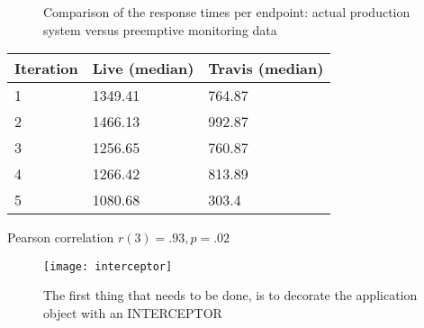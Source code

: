 
\begin{figure}[h!]
  \centering
  \quad
  \caption{Comparison of the response times per endpoint: actual production system versus preemptive monitoring data}
  \label{fig:preemptive}
\end{figure}


\begin{table}[h]
  \begin{tabular}{lll}
    \toprule
    Iteration & \bfseries Live (median) & \bfseries Travis (median)\\
    \midrule
    1 & 1349.41 & 764.87\\ 
    2 & 1466.13 & 992.87\\
    3 & 1256.65 & 760.87\\
    4 & 1266.42 & 813.89\\
    5 & 1080.68 & 303.4\\
    \bottomrule
  \end{tabular}
\end{table}

Pearson correlation $r(3)=.93, p=.02$




    \begin{figure*}[ht!]
      \centering
      \texttt{[image: interceptor]}
      \caption{The first thing that needs to be done, is to decorate the application object with an INTERCEPTOR}
      \label{fig:sep}
    \end{figure*}

\newpage
